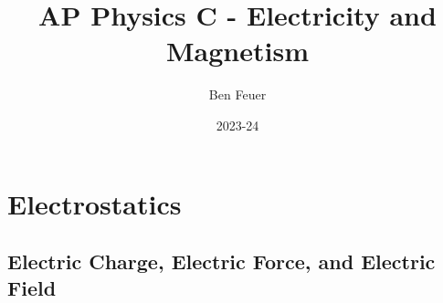 \documentclass{report}
\title{\Huge{AP Physics C - Electricity and Magnetism}}
\author{\huge{Ben Feuer}}
\date{2023-24}
\begin{document}
\maketitle
\newpage%
\setcounter{tocdepth}{3}
\tableofcontents
\pagebreak





\chapter{Electrostatics}

\section{Electric Charge, Electric Force, and Electric Field}
\end{document}
